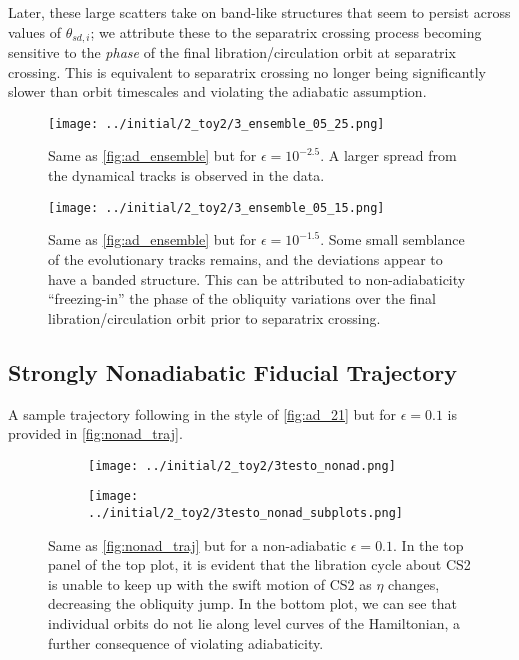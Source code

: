 \documentclass[
        fleqn,
        usenatbib,
    ]{mnras}
\begin{document}
Later, these large scatters take on band-like structures that seem to persist
across values of $\theta_{sd, i}$; we attribute these to the separatrix crossing
process becoming sensitive to the \emph{phase} of the final
libration/circulation orbit at separatrix crossing. This is equivalent to
separatrix crossing no longer being significantly slower than orbit timescales
and violating the adiabatic assumption.
\begin{figure}
    \centering
    \texttt{[image: ../initial/2\_toy2/3\_ensemble\_05\_25.png]}
    \caption{Same as \autoref{fig:ad_ensemble} but for $\epsilon = 10^{-2.5}$.
    A larger spread from the dynamical tracks is observed in the
    data.}\label{fig:3_ensemble_05_25}
\end{figure}
\begin{figure}
    \centering
    \texttt{[image: ../initial/2\_toy2/3\_ensemble\_05\_15.png]}
    \caption{Same as \autoref{fig:ad_ensemble} but for $\epsilon = 10^{-1.5}$.
    Some small semblance of the evolutionary tracks remains, and the deviations
    appear to have a banded structure. This can be attributed to
    non-adiabaticity ``freezing-in'' the phase of the obliquity variations over
    the final libration/circulation orbit prior to separatrix
    crossing.}\label{fig:3_ensemble_05_15}
\end{figure}

\subsection{Strongly Nonadiabatic Fiducial Trajectory}

A sample trajectory following in the style of \autoref{fig:ad_21} but for
$\epsilon = 0.1$ is provided in \autoref{fig:nonad_traj}.
\begin{figure}
    \centering
    \begin{subfigure}{\columnwidth}
        \centering
        \texttt{[image: ../initial/2\_toy2/3testo\_nonad.png]}
    \end{subfigure}
    \begin{subfigure}{\columnwidth}
        \centering
        \texttt{[image: ../initial/2\_toy2/3testo\_nonad\_subplots.png]}
    \end{subfigure}
    \caption{Same as \autoref{fig:nonad_traj} but for a non-adiabatic $\epsilon =
    0.1$. In the top panel of the top plot, it is evident that the libration
    cycle about CS2 is unable to keep up with the swift motion of CS2 as $\eta$
    changes, decreasing the obliquity jump. In the bottom plot, we can see that
    individual orbits do not lie along level curves of the Hamiltonian, a
    further consequence of violating adiabaticity.}\label{fig:nonad_traj}
\end{figure}
\end{document}
